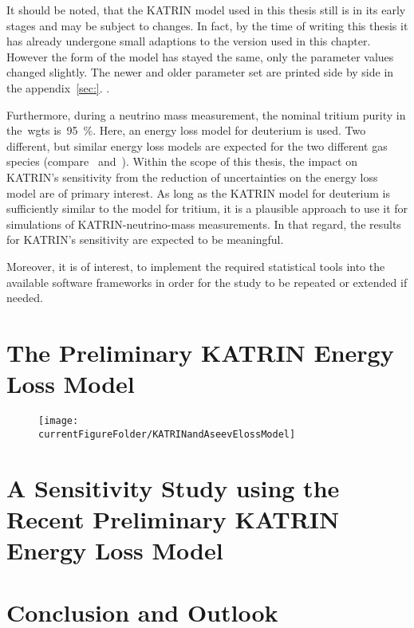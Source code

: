 It should be noted, that the KATRIN model used in this thesis still is in its early stages and may be subject to changes. In fact, by the time of writing this thesis it has already undergone small adaptions to the version used in this chapter. However the form of the model has stayed the same, only the parameter values changed slightly. The newer and older parameter set are printed side by side in the appendix~\ref{sec:}. .

Furthermore, during a neutrino mass measurement, the nominal tritium purity in the~\gls{wgts} is~\SI{95}{\percent}. Here, an energy loss model for deuterium is used. Two different, but similar energy loss models are expected for the two different gas species (compare~\cite{Abdurashitov2017} and~\cite{Aseev2000}). Within the scope of this thesis, the impact on KATRIN's sensitivity from the reduction of uncertainties on the energy loss model are of primary interest. As long as the KATRIN model for deuterium is sufficiently similar to the model for tritium, it is a plausible approach to use it for simulations of KATRIN-neutrino-mass measurements. In that regard, the results for KATRIN's sensitivity are expected to be meaningful.

Moreover, it is of interest, to implement the required statistical tools into the available software frameworks in order for the study to be repeated or extended if needed.

\section{The Preliminary KATRIN Energy Loss Model}
\label{sec:katrinElossModel}
\begin{figure}[th]
	\centering
	\texttt{[image: \\currentFigureFolder/KATRINandAseevElossModel]}
	\xcaption{}{}{}
	\label{fig:katrinElossElossModel}
\end{figure}




\section{A Sensitivity Study using the Recent Preliminary KATRIN Energy Loss Model}
\label{sec:katrinElossModelResults}

\section{Conclusion and Outlook}
\label{sec:katrinElossModelConclusion}